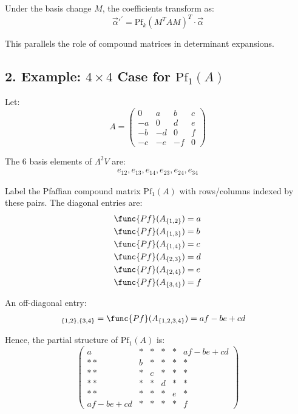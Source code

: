 \documentclass[aps,prd,onecolumn,notitlepage,nofootinbib]{revtex4-2}
\begin{document}
Under the basis change $M$, the coefficients transform as: 
\begin{equation}
\vec{\alpha}\prime ^{\prime }=\mathrm{Pf}_{k}(M^{T}AM)^{T}\cdot \vec{\alpha}
\end{equation}

This parallels the role of compound matrices in determinant expansions.

\subsection*{2. Example: $4 \times 4$ Case for $\mathrm{Pf}_1(A)$}

Let: 
\begin{equation}
A = 
\begin{pmatrix}
0 & a & b & c \\ 
-a & 0 & d & e \\ 
-b & -d & 0 & f \\ 
-c & -e & -f & 0%
\end{pmatrix}%
\end{equation}

The 6 basis elements of $\Lambda^2 V$ are: 
\begin{align*}
e_{12}, e_{13}, e_{14}, e_{23}, e_{24}, e_{34}
\end{align*}

Label the Pfaffian compound matrix $\mathrm{Pf}_1(A)$ with rows/columns
indexed by these pairs. The diagonal entries are: 
\begin{align*}
\func{Pf}(A_{\{1,2\}}) &= a \\
\func{Pf}(A_{\{1,3\}}) &= b \\
\func{Pf}(A_{\{1,4\}}) &= c \\
\func{Pf}(A_{\{2,3\}}) &= d \\
\func{Pf}(A_{\{2,4\}}) &= e \\
\func{Pf}(A_{\{3,4\}}) &= f
\end{align*}

An off-diagonal entry: 
\begin{align*}
[\mathrm{Pf}_1(A)]_{\{1,2\},\{3,4\}} &= \func{Pf}(A_{\{1,2,3,4\}}) = af - be
+ cd
\end{align*}

Hence, the partial structure of $\mathrm{Pf}_{1}(A)$ is: 
\begin{equation}
\begin{pmatrix}
a & \ast & \ast & \ast & \ast & af-be+cd \\* 
\ast & b & \ast & \ast & \ast & \ast \\* 
\ast & \ast & c & \ast & \ast & \ast \\* 
\ast & \ast & \ast & d & \ast & \ast \\* 
\ast & \ast & \ast & \ast & e & \ast \\ 
af-be+cd & \ast & \ast & \ast & \ast & f%
\end{pmatrix}%
\end{equation}
\end{document}
